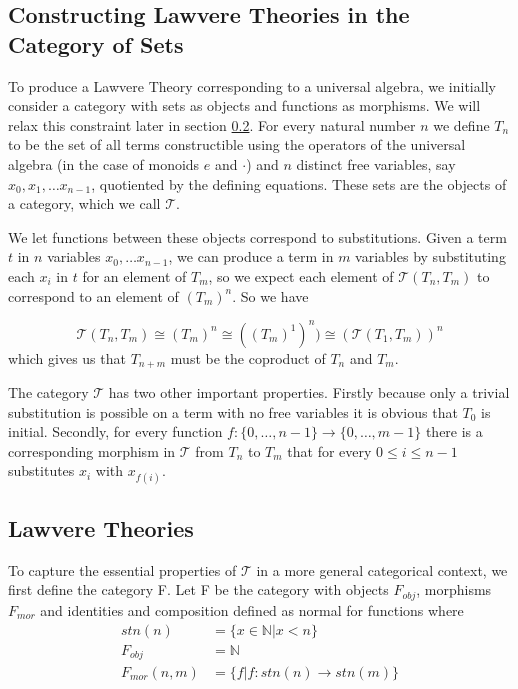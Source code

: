 \subsection{Constructing Lawvere Theories in the Category of Sets}
To produce a Lawvere Theory corresponding to a universal algebra, we initially
consider a category with sets as objects and functions as morphisms. We will
relax this constraint later in section \ref{gen_LT}. For every natural number
$n$ we define $T_n$ to be the set of all terms constructible using the operators
of the universal algebra (in the case of monoids $e$ and $\cdot$) and $n$
distinct free variables, say $x_0, x_1,\ldots x_{n-1}$, quotiented by the
defining equations. These sets are the objects of a category, which we call
$\mathcal{T}$.

We let functions between these objects correspond to substitutions. Given a term
$t$ in $n$ variables $x_0,\ldots x_{n-1}$, we can produce a term in $m$
variables by substituting each $x_i$ in $t$ for an element of $T_m$, so we
expect each element of $\mathcal{T}(T_n, T_m)$ to correspond to an element of
$(T_m)^n$. So we have

\[
\mathcal{T}(T_n, T_m)\cong
(T_m)^n\cong
((T_m)^1)^n)\cong
(\mathcal{T}(T_1, T_m))^n
\]
which gives us that $T_{n+m}$ must be the coproduct of $T_n$ and
$T_m$.

The category $\mathcal{T}$ has two other important properties. Firstly because
only a trivial substitution is possible on a term with no free variables it is
obvious that $T_0$ is initial. Secondly, for every function $f: \{0,\ldots,
n-1\} \rightarrow \{0,\ldots, m-1\}$ there is a corresponding morphism in
$\mathcal{T}$ from $T_n$ to $T_m$ that for every $0\leq i\leq n-1$ substitutes
$x_i$ with $x_{f(i)}$.

\subsection{Lawvere Theories} \label{gen_LT}
To capture the essential properties of $\mathcal{T}$ in a more general
categorical context, we first define the category F. Let F be the category with
objects $F_{obj}$, morphisms $F_{mor}$ and identities and composition defined as
normal for functions where
\begin{align*}
    stn(n) &= \{x\in \mathbb{N} | x < n\} \\
    F_{obj} &= \mathbb{N} \\
    F_{mor}(n, m) &= \{f | f: stn(n)\to stn(m)\}
\end{align*}

